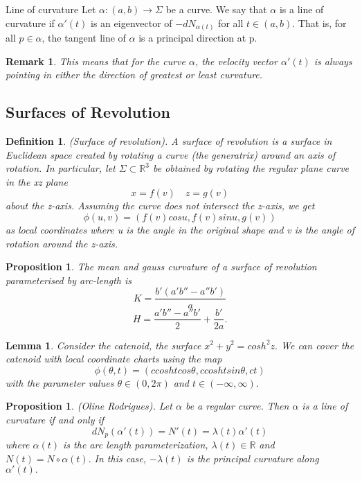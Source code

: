 \documentclass[twoside]{article}
\newtheorem{lemma}[theorem]{Lemma}
\newtheorem{proposition}[theorem]{Proposition}
\newtheorem{definition}[theorem]{Definition}
\newtheorem{remark}[theorem]{Remark}
\begin{document}
\begin{definition_exam}{Line of curvature}{} Let $\alpha: (a,b) \rightarrow \Sigma$ be a curve. We say that $\alpha$ is a line of curvature if $\alpha'(t)$ is an eigenvector of $-dN_{\alpha(t)}$ for all $t \in (a,b).$ That is, for all $p \in \alpha$, the tangent line of $\alpha$ is a principal direction at p.
\end{definition_exam}

\begin{remark}This means that for the curve $\alpha$, the velocity vector $\alpha'(t)$ is always pointing in either the direction of greatest or least curvature.
\end{remark}
\subsection{Surfaces of Revolution}
\begin{definition}(Surface of revolution). A surface of revolution is a surface in Euclidean space created by rotating a curve (the generatrix) around an axis of rotation. In particular, let $\Sigma \subset \mathbb{R}^3$ be obtained by rotating the regular plane curve in the xz plane 
$$
x = f(v) \quad z = g(v)
$$
about the z-axis. Assuming the curve does not intersect the z-axis, we get 
$$
\phi(u,v) = (f(v)cosu,f(v)sinu,g(v))
$$
as local coordinates where u is the angle in the original shape and v is the angle of rotation around the z-axis.
\end{definition}

\begin{proposition}The mean and gauss curvature of a surface of revolution parameterised by arc-length is 
$$
K = \frac{b'(a'b'' - a''b')}{a}
$$
$$
H = \frac{a'b'' - a''b'}{2} + \frac{b'}{2a}.
$$
\end{proposition}

\begin{lemma}Consider the catenoid, the surface $x^2 + y^2 = cosh^2z.$ We can cover the catenoid with local coordinate charts using the map 
$$
\phi(\theta,t) = (c coshtcos\theta, c coshtsin\theta, ct)
$$
with the parameter values $\theta \in (0,2\pi)$ and $t \in (-\infty,\infty).$
\end{lemma}

\begin{proposition}(Oline Rodrigues). Let $\alpha$ be a regular curve. Then $\alpha$ is a line of curvature if and only if 
$$
dN_p(\alpha'(t)) = N'(t) = \lambda(t)\alpha'(t)
$$
where $\alpha(t)$ is the arc length parameterization, $\lambda(t) \in \mathbb{R}$ and $N(t) = N \circ \alpha(t).$ In this case, $-\lambda(t)$ is the principal curvature along $\alpha'(t).$
\end{proposition}
\end{document}
